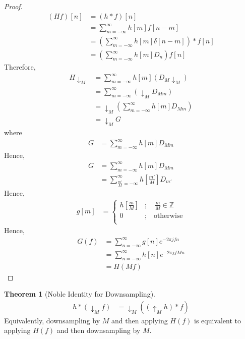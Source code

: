 \documentclass[titlepage, fleqn, a4paper, 12pt, twoside]{article}
\theoremstyle{definition}
\theoremstyle{theorem}
\newtheorem{theorem}{Theorem}
\def\downsample#1{\downarrow_{#1}}
\def\upsample#1{\uparrow_{#1}}
\begin{document}
\begin{proof}
	\begin{align*}
		(H f)[n] &= (h \ast f)[n]\\
		&= \sum\limits_{m = -\infty}^{\infty} h[m] f[n - m]\\
		&= \left( \sum\limits_{m = -\infty}^{\infty} h[m] \delta[n - m] \right) \ast f[n]\\
		&= \left( \sum\limits_{m = -\infty}^{\infty} h[m] D_n \right) f[n]
	\end{align*}
	Therefore,
	\begin{align*}
		H \downsample{M} &= \sum\limits_{m = -\infty}^{\infty} h[m] (D_M \downsample{M})\\
		&= \sum\limits_{m = -\infty}^{\infty} (\downsample{M} D_{M m})\\
		&= \downsample{M} \left( \sum\limits_{m = -\infty}^{\infty} h[m] D_{M m} \right)\\
		&= \downsample{M} G
	\end{align*}
	where
	\begin{align*}
		G &= \sum\limits_{m = -\infty}^{\infty} h[m] D_{M m}
	\end{align*}
	Hence,
	\begin{align*}
		G &= \sum\limits_{m = -\infty}^{\infty} h[m] D_{M m}\\
		&= \sum\limits_{\frac{m'}{M} = -\infty}^{\infty} h\left[ \frac{m'}{M} \right] D_{m'}
	\end{align*}
	Hence,
	\begin{align*}
		g[m] &=
			\begin{cases}
				h\left[ \frac{m}{M} \right] &;\quad \frac{m}{M} \in \mathbb{Z}\\
				0 &;\quad \text{otherwise}\\
			\end{cases}
	\end{align*}
	Hence,
	\begin{align*}
		G(f) &= \sum\limits_{n = -\infty}^{\infty} g[n] e^{-2 \pi j f n}\\
		&= \sum\limits_{n = -\infty}^{\infty} h[n] e^{-2 \pi j f M n}\\
		&= H(M f)
	\end{align*}
\end{proof}

\begin{theorem}[Noble Identity for Downsampling]
	\begin{align*}
		h \ast (\downsample{M} f) &= \downsample{M} \left( (\upsample{M} h) \ast f \right)
	\end{align*}
	Equivalently, downsampling by $M$ and then applying $H(f)$ is equivalent to applying $H(f)$ and then downsampling by $M$.
	\label{thm:Noble_identity_for_downsampling}
\end{theorem}
\end{document}
